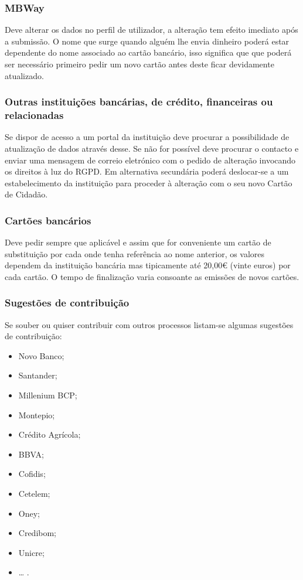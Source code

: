 \subsubsection{MBWay}

Deve alterar os dados no perfil de utilizador, a alteração tem efeito
imediato após a submissão. O nome que surge quando alguém lhe envia
dinheiro poderá estar dependente do nome associado ao cartão bancário,
isso significa que que poderá ser necessário primeiro pedir um novo
cartão antes deste ficar devidamente atualizado.

\subsubsection{Outras instituições bancárias, de crédito, financeiras ou relacionadas}

Se dispor de acesso a um portal da instituição deve procurar a
possibilidade de atualização de dados através desse. Se não for possível
deve procurar o contacto e enviar uma mensagem de correio eletrónico com
o pedido de alteração invocando os direitos à luz do RGPD. Em
alternativa secundária poderá deslocar-se a um estabelecimento da
instituição para proceder à alteração com o seu novo Cartão de Cidadão.

\subsubsection{Cartões bancários}

Deve pedir sempre que aplicável e assim que for conveniente um cartão de
substituição por cada onde tenha referência ao nome anterior, os valores
dependem da instituição bancária mas tipicamente até 20,00€ (vinte
euros) por cada cartão. O tempo de finalização varia consoante as
emissões de novos cartões.

\subsubsection{Sugestões de contribuição}

Se souber ou quiser contribuir com outros processos listam-se algumas
sugestões de contribuição:
\begin{itemize}
	\item Novo Banco;
	\item Santander;
	\item Millenium BCP;
	\item Montepio;
	\item Crédito Agrícola;
	\item BBVA;
	\item Cofidis;
	\item Cetelem;
	\item Oney;
	\item Credibom;
	\item Unicre;
	\item \ldots{} .
\end{itemize}

